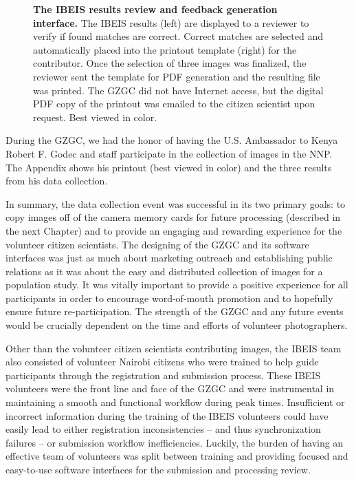 \begin{figure}[t]%
	\centering
    	\caption[The IBEIS Results Review and Feedback Generation Interface]{\textbf{The IBEIS results review and feedback generation interface.}  The IBEIS results (left) are displayed to a reviewer to verify if found matches are correct.  Correct matches are selected and automatically placed into the printout template (right) for the contributor.  Once the selection of three images was finalized, the reviewer sent the template for PDF generation and the resulting file was printed.  The GZGC did not have Internet access, but the digital PDF copy of the printout was emailed to the citizen scientist upon request.  Best viewed in color.}
    	\label{fig:client-printout}
\end{figure}

During the GZGC, we had the honor of having the U.S. Ambassador to Kenya Robert F. Godec and staff participate in the collection of images in the NNP.  The Appendix shows his printout (best viewed in color) and the three results from his data collection.

In summary, the data collection event was successful in its two primary goals: to copy images off of the camera memory cards for future processing (described in the next Chapter) and to provide an engaging and rewarding experience for the volunteer citizen scientists.  The designing of the GZGC and its software interfaces was just as much about marketing outreach and establishing public relations as it was about the easy and distributed collection of images for a population study.  It was vitally important to provide a positive experience for all participants in order to encourage word-of-mouth promotion and to hopefully ensure future re-participation.  The strength of the GZGC and any future events would be crucially dependent on the time and efforts of volunteer photographers.  %

Other than the volunteer citizen scientists contributing images, the IBEIS team also consisted of volunteer Nairobi citizens who were trained to help guide participants through the registration and submission process.  These IBEIS volunteers were the front line and face of the GZGC and were instrumental in maintaining a smooth and functional workflow during peak times.  Insufficient or incorrect information during the training of the IBEIS volunteers could have easily lead to either registration inconsistencies -- and thus synchronization failures -- or submission workflow inefficiencies.  Luckily, the burden of having an effective team of volunteers was split between training and providing focused and easy-to-use software interfaces for the submission and processing review.

